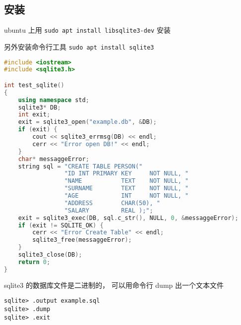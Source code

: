 
\begin{issues}
\issueDraft
\end{issues}

\subsection{安装}
ubuntu 上用 \verb|sudo apt install libsqlite3-dev| 安装

另外安装命令行工具 \verb|sudo apt install sqlite3|

\begin{lstlisting}[language=cpp]
#include <iostream>
#include <sqlite3.h>

int test_sqlite()
{
	using namespace std;
    sqlite3* DB;
    int exit;
    exit = sqlite3_open("example.db", &DB);
    if (exit) {
		cout << sqlite3_errmsg(DB) << endl;
        cerr << "Error open DB!" << endl;
    }
	char* messaggeError;
	string sql = "CREATE TABLE PERSON("
                 "ID INT PRIMARY KEY     NOT NULL, "
                 "NAME           TEXT    NOT NULL, "
                 "SURNAME        TEXT    NOT NULL, "
                 "AGE            INT     NOT NULL, "
                 "ADDRESS        CHAR(50), "
                 "SALARY         REAL );";
	exit = sqlite3_exec(DB, sql.c_str(), NULL, 0, &messaggeError);
    if (exit != SQLITE_OK) {
        cerr << "Error Create Table" << endl;
        sqlite3_free(messaggeError);
    }
    sqlite3_close(DB);
    return 0;
}
\end{lstlisting}

sqlite3 的数据库文件是二进制的， 可以用命令行 dump 出一个文本文件
\begin{lstlisting}
sqlite> .output example.sql
sqlite> .dump
sqlite> .exit
\end{lstlisting}
